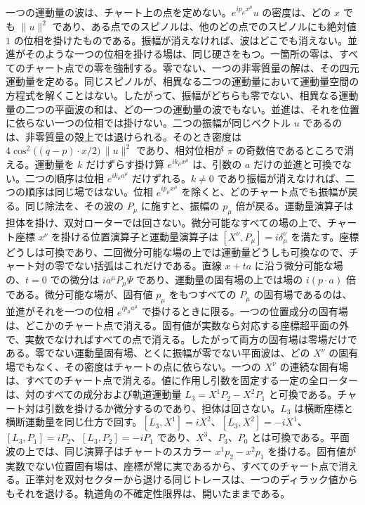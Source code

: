 \documentclass[a4paper]{article}
\begin{document}
一つの運動量の波は、チャート上の点を定めない。$e^{ip_\mu x^\mu}u$ の密度は、どの $x$ でも $\lVert u\rVert^2$ であり、ある点でのスピノルは、他のどの点でのスピノルにも絶対値 $1$ の位相を掛けたものである。振幅が消えなければ、波はどこでも消えない。並進がそのような一つの位相を掛ける場は、同じ硬さをもつ。一箇所の零は、すべてのチャート点での零を強制する。零でない、一つの非零質量の解は、その四元運動量を定める。同じスピノルが、相異なる二つの運動量において運動量空間の方程式を解くことはない。したがって、振幅がどちらも零でない、相異なる運動量の二つの平面波の和は、どの一つの運動量の波でもない。並進は、それを位置に依らない一つの位相では掛けない。二つの振幅が同じベクトル $u$ であるのは、非零質量の殻上では退けられる。そのとき密度は $4\cos^2\bigl((q-p)\cdot x/2\bigr)\,\lVert u\rVert^2$ であり、相対位相が $\pi$ の奇数倍であるところで消える。運動量を $k$ だけずらす掛け算 $e^{ik_\mu x^\mu}$ は、引数の $a$ だけの並進と可換でない。二つの順序は位相 $e^{ik_\mu a^\mu}$ だけずれる。$k\neq 0$ であり振幅が消えなければ、二つの順序は同じ場ではない。位相 $e^{ip_\mu x^\mu}$ を除くと、どのチャート点でも振幅が戻る。同じ除法を、その波の $P_\mu$ に施すと、振幅の $p_\mu$ 倍が戻る。運動量演算子は担体を掛け、双対ローターでは回さない。微分可能なすべての場の上で、チャート座標 $x^\nu$ を掛ける位置演算子と運動量演算子は $[X^\nu,P_\mu]=i\delta^\nu_\mu$ を満たす。座標どうしは可換であり、二回微分可能な場の上では運動量どうしも可換なので、チャート対の零でない括弧はこれだけである。直線 $x+ta$ に沿う微分可能な場の、$t=0$ での微分は $ia^\mu P_\mu\Psi$ であり、運動量の固有場の上では場の $i(p\cdot a)$ 倍である。微分可能な場が、固有値 $p_\mu$ をもつすべての $P_\mu$ の固有場であるのは、並進がそれを一つの位相 $e^{ip_\mu a^\mu}$ で掛けるときに限る。一つの位置成分の固有場は、どこかのチャート点で消える。固有値が実数なら対応する座標超平面の外で、実数でなければすべての点で消える。したがって両方の固有場は零場だけである。零でない運動量固有場、とくに振幅が零でない平面波は、どの $X^\nu$ の固有場でもなく、その密度はチャートの点に依らない。一つの $X^\nu$ の連続な固有場は、すべてのチャート点で消える。値に作用し引数を固定する一定の全ローターは、対のすべての成分および軌道運動量 $L_3=X^1P_2-X^2P_1$ と可換である。チャート対は引数を掛けるか微分するのであり、担体は回さない。$L_3$ は横断座標と横断運動量を同じ仕方で回す。$[L_3,X^1]=iX^2$、$[L_3,X^2]=-iX^1$、$[L_3,P_1]=iP_2$、$[L_3,P_2]=-iP_1$ であり、$X^3$、$P_3$、$P_0$ とは可換である。平面波の上では、同じ演算子はチャートのスカラー $x^1p_2-x^2p_1$ を掛ける。固有値が実数でない位置固有場は、座標が常に実であるから、すべてのチャート点で消える。正準対を双対セクターから退ける同じトレースは、一つのディラック値からもそれを退ける。軌道角の不確定性限界は、開いたままである。
\end{document}
